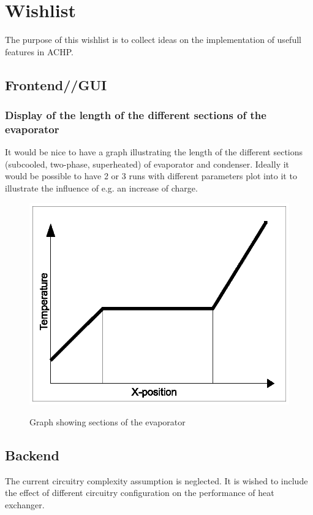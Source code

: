 \documentclass[]{article}
\begin{document}
\section{Wishlist}
The purpose of this wishlist is to collect ideas on the implementation of usefull features in ACHP.

\subsection{Frontend//GUI}
\subsubsection{Display of the length of the different sections of the evaporator}
It would be nice to have a graph illustrating the length of the different sections
(subcooled, two-phase, superheated) of evaporator and condenser. Ideally it would be possible
to have 2 or 3 runs with different parameters plot into it to illustrate the influence
of e.g. an increase of charge.
  
\begin{figure}[htbp]
	\centering
		\includegraphics{wishlist_drawings_section_graph.eps}
	\label{fig:wishlist_drawings_section_graph}
	\caption{Graph showing sections of the evaporator}
\end{figure}


\subsection{Backend}
The current circuitry complexity assumption is neglected. It is wished to include the effect of different circuitry configuration on the performance of heat exchanger.
\end{document}
